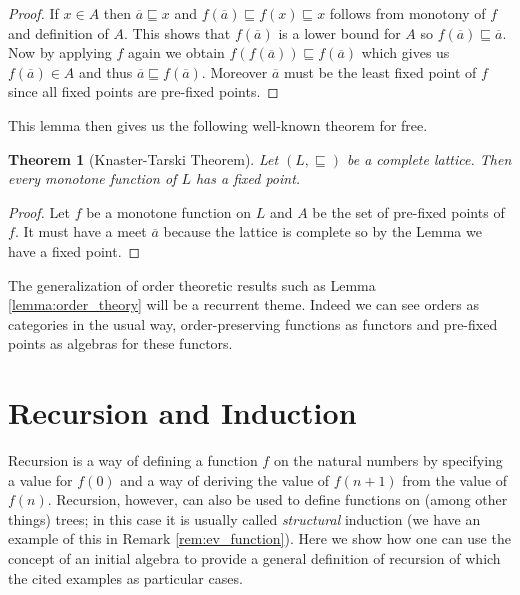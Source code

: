 \documentclass[letterpaper, 11pt, oneside]{memoir}
\theoremstyle{myteo}
\newtheorem{theorem}{Theorem}[section]
\numberwithin{equation}{section}
\begin{document}
\begin{proof}
  If \(x \in A\) then \(\overline{a} \sqsubseteq x\) and \(f(\overline{a}) \sqsubseteq f(x) \sqsubseteq x\) follows from monotony of \(f\) and definition of \(A\).
  This shows that \(f(\overline{a})\) is a lower bound for \(A\) so \(f(\overline{a}) \sqsubseteq \overline{a}\).
  Now by applying \(f\) again we obtain \(f(f(\overline{a})) \sqsubseteq f(\overline{a})\) which gives us \(f(\overline{a}) \in A\) and thus \(\overline{a} \sqsubseteq f(\overline{a})\).
  Moreover \(\overline{a}\) must be the least fixed point of \(f\) since all fixed points are pre-fixed points.
\end{proof}

This lemma then gives us the following well-known theorem for free.

\begin{theorem}[Knaster-Tarski Theorem]
  \label{teo:knaster_tarski}
  Let \((L, \sqsubseteq)\) be a complete lattice.
  Then every monotone function of \(L\) has a fixed point.
\end{theorem}

\begin{proof}
  Let \(f\) be a monotone function on \(L\) and \(A\) be the set of pre-fixed points of \(f\).
  It must have a meet \(\overline{a}\) because the lattice is complete so by the Lemma we have a fixed point.
\end{proof}

The generalization of order theoretic results such as Lemma \ref{lemma:order_theory} will be a recurrent theme.
Indeed we can see orders as categories in the usual way, order-preserving functions as functors and pre-fixed points as algebras for these functors.

\section{Recursion and Induction}

Recursion is a way of defining a function \(f\) on the natural numbers by specifying a value for \(f(0)\) and a way of deriving the value of \(f(n + 1)\) from the value of \(f(n)\).
Recursion, however, can also be used to define functions on (among other things) trees; in this case it is usually called \emph{structural} induction (we have an example of this in Remark \ref{rem:ev_function}).
Here we show how one can use the concept of an initial algebra to provide a general definition of recursion of which the cited examples as particular cases.
\end{document}
